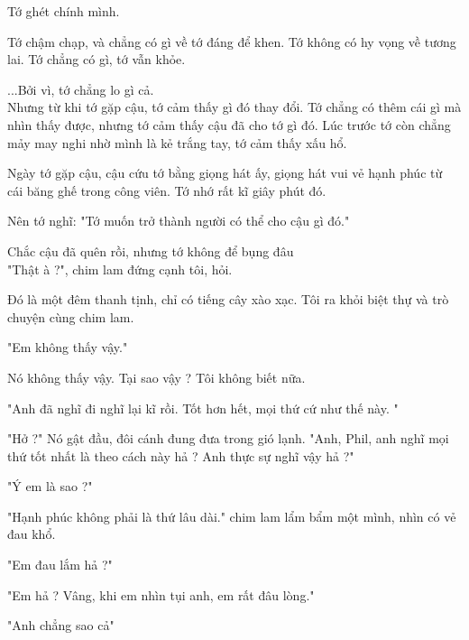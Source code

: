 
Tớ ghét chính mình.

Tớ chậm chạp, và chẳng có gì về tớ đáng để khen. Tớ không có hy vọng về tương lai. Tớ chẳng có gì, tớ vẫn khỏe.

...Bởi vì, tớ chẳng lo gì cả. \\

Nhưng từ khi tớ gặp cậu, tớ cảm thấy gì đó thay đổi. Tớ chẳng có thêm cái gì mà nhìn thấy được, nhưng tớ cảm thấy cậu đã cho tớ gì đó. Lúc trước tớ còn chẳng mảy may nghi nhờ mình là kẻ trắng tay, tớ cảm thấy xấu hổ.

Ngày tớ gặp cậu, cậu cứu tớ bằng giọng hát ấy, giọng hát vui vẻ hạnh phúc từ cái băng ghế trong công viên. Tớ nhớ rất kĩ giây phút đó.

Nên tớ nghĩ: "Tớ muốn trở thành người có thể cho cậu gì đó."

Chắc cậu đã quên rồi, nhưng tớ không để bụng đâu \\ 


"Thật à ?", chim lam đứng cạnh tôi, hỏi.

Đó là một đêm thanh tịnh, chỉ có tiếng cây xào xạc. Tôi ra khỏi biệt thự và trò chuyện cùng chim lam.

"Em không thấy vậy."

Nó không thấy vậy. Tại sao vậy ? Tôi không biết nữa.

"Anh đã nghĩ đi nghĩ lại kĩ rồi. Tốt hơn hết, mọi thứ cứ như thế này. "

"Hở ?" Nó gật đầu, đôi cánh đung đưa trong gió lạnh. "Anh, Phil, anh nghĩ mọi thứ tốt nhất là theo cách này hả ? Anh thực sự nghĩ vậy hả ?"

"Ý em là sao ?"

"Hạnh phúc không phải là thứ lâu dài." chim lam lẩm bẩm một mình, nhìn có vẻ đau khổ.

"Em đau lắm hả ?"

"Em hả ? Vâng, khi em nhìn tụi anh, em rất đâu lòng."

"Anh chẳng sao cả"

